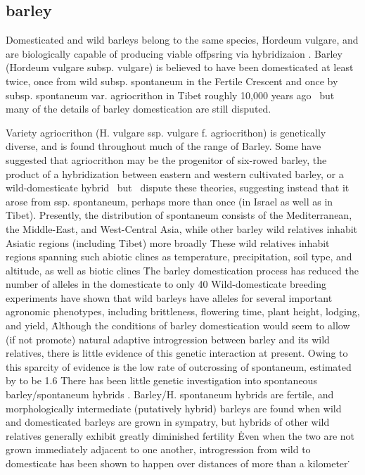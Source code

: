 \documentclass[11pt]{article}
\begin{document}
\subsection*{barley}

Domesticated and wild barleys belong to the same species, Hordeum vulgare, and are biologically capable of producing viable offpsring via hybridizaion \cite{von1995ecographical}.
Barley (Hordeum vulgare subsp. vulgare) is believed to have been domesticated at least twice, once from wild subsp. spontaneum in the Fertile Crescent and once by subsp. spontaneum var. agriocrithon in Tibet roughly 10,000 years ago \cite{takahashi1955origin, badr2000origin, oka2012origin, azhaguvel2007phylogenetic, haberer2015barley}\, but many of the details of barley domestication are still disputed.

Variety agriocrithon (H. vulgare ssp. vulgare f. agriocrithon) is genetically diverse, and is found throughout much of the range of Barley.
Some have suggested that agriocrithon may be the progenitor of six-rowed barley, the product of a hybridization between eastern and western cultivated barley, or a wild-domesticate hybrid \cite{staudt1961origin, zohary1959hordeum, murphy1982origin}\, but \cite{azhaguvel2007phylogenetic}\ dispute these theories, suggesting instead that it arose from ssp. spontaneum, perhaps more than once (in Israel as well as in Tibet).
Presently, the distribution of spontaneum consists of the Mediterranean, the Middle-East, and West-Central Asia, while other barley wild relatives inhabit Asiatic regions (including Tibet) more broadly \cite{nevo2010drought, harlan1995living, CWR}\.
These wild relatives inhabit regions spanning such abiotic clines as temperature, precipitation, soil type, and altitude, as well as biotic clines \cite{nevo2010drought}\.

The barley domestication process has reduced the number of alleles in the domesticate to only 40%
Wild-domesticate breeding experiments have shown that wild barleys have alleles for several important agronomic phenotypes, including brittleness, flowering time, plant height, lodging, and yield,  \cite{von2006ab, handley1994chromosome}\.
Although the conditions of barley domestication would seem to allow (if not promote) natural adaptive introgression between barley and its wild relatives, there is little evidence of this genetic interaction at present.
Owing to this sparcity of evidence is the low rate of outcrossing of spontaneum, estimated by \cite{brown1978outcrossing} to be 1.6%
There has been little genetic investigation into spontaneous barley/spontaneum hybrids \cite{ellstrand2003dangerous}.
Barley/H. spontaneum hybrids are fertile, and morphologically intermediate (putatively hybrid) barleys are found when wild and domesticated barleys are grown in sympatry, but hybrids of other wild relatives generally exhibit greatly diminished fertility \cite{ellstrand2003dangerous, harlan1995living}\.
Even when the two are not grown immediately adjacent to one another, introgression from wild to domesticate has been shown to happen over distances of more than a kilometer \cite{hillman2001new}\.
\end{document}
